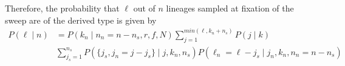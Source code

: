 \documentclass[reqno]{amsart}
\begin{document}
Therefore, the probability that $\ell$ out of $n$ lineages sampled at fixation of the sweep are of the derived type is given by
\begin{align}
	P(\ell \mid n) &= P(k_n \mid n_n = n - n_s, r , f  ,N )\sum_{j=1}^{min(\ell,k_n+n_s)}P(j\mid k) \\ 
	&\sum_{j_s = 1}^{n_s} P(\{j_s,j_n = j - j_s\}\mid j , k_n , n_s) 
	P\left(\ell_n = \ell - j_s \mid j_n , k_n , n_n = n - n_s\right)
\end{align}


\end{document}
